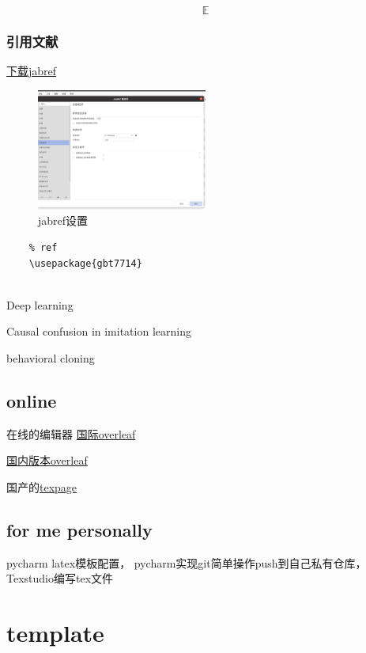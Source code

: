 \documentclass[11pt]{ctexart}
\newcommand{\EE}{\mathbb{E}}
\begin{document}
\begin{equation}
	\EE
\end{equation}
 
 \subsubsection{引用文献}
 
 \href{https://www.jabref.org/}{下载jabref}
 
 \begin{figure}[h]
 	\centering
 	\includegraphics[width=0.5\textwidth]{images/jabref_set.png}
 	\caption{jabref设置}
 	
 \end{figure}
 
 \begin{lstlisting}
 	% ref
 	\usepackage{gbt7714}
 	
 \end{lstlisting}
 
 Deep learning\cite{lecun2015deep}
 
 Causal confusion in imitation learning\cite{de2019causal}
 
 behavioral cloning\cite{wen2020fighting}
 
 
 \subsection{online}
 
 在线的编辑器 \href{www.overleaf.com}{国际overleaf}
 
 \href{cn.overleaf.com}{国内版本overleaf}
 
 国产的\href{www.texpage.com}{texpage}
 
 
 \subsection{for me personally}
 
 pycharm latex模板配置， pycharm实现git简单操作push到自己私有仓库，Texstudio编写tex文件
 
 \section{template}
\end{document}
